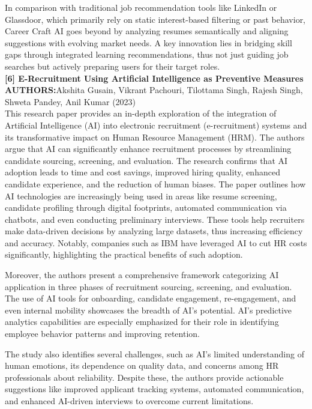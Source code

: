 \documentclass[a4paper, 12pt]{report}
\begin{document}
In comparison with traditional job recommendation tools like LinkedIn or Glassdoor, which primarily rely on static interest-based filtering or past behavior, Career Craft AI goes beyond by analyzing resumes semantically and aligning suggestions with evolving market needs. A key innovation lies in bridging skill gaps through integrated learning recommendations, thus not just guiding job searches but actively preparing users for their target roles.\\
\noindent\textbf{[6] E-Recruitment Using Artificial Intelligence as Preventive Measures}\\
\textbf{AUTHORS:}Akshita Gusain, Vikrant Pachouri, Tilottama Singh, Rajesh Singh, Shweta Pandey, Anil Kumar (2023)\\
This research paper provides an in-depth exploration of the integration of Artificial Intelligence (AI) into electronic recruitment (e-recruitment) systems and its transformative impact on Human Resource Management (HRM). The authors argue that AI can significantly enhance recruitment processes by streamlining candidate sourcing, screening, and evaluation. The research confirms that AI adoption leads to time and cost savings, improved hiring quality, enhanced candidate experience, and the reduction of human biases. The paper outlines how AI technologies are increasingly being used in areas like resume screening, candidate profiling through digital footprints, automated communication via chatbots, and even conducting preliminary interviews. These tools help recruiters make data-driven decisions by analyzing large datasets, thus increasing efficiency and accuracy. Notably, companies such as IBM have leveraged AI to cut HR costs significantly, highlighting the practical benefits of such adoption.

Moreover, the authors present a comprehensive framework categorizing AI application in three phases of recruitment sourcing, screening, and evaluation. The use of AI tools for onboarding, candidate engagement, re-engagement, and even internal mobility showcases the breadth of AI’s potential. AI’s predictive analytics capabilities are especially emphasized for their role in identifying employee behavior patterns and improving retention.

The study also identifies several challenges, such as AI’s limited understanding of human emotions, its dependence on quality data, and concerns among HR professionals about reliability. Despite these, the authors provide actionable suggestions like improved applicant tracking systems, automated communication, and enhanced AI-driven interviews to overcome current limitations.
\end{document}
